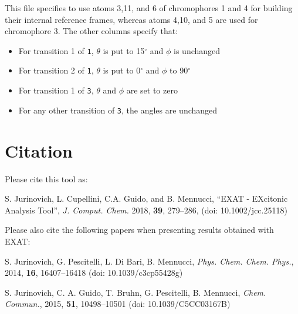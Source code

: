 \documentclass[a4paper,11pt]{article}
\begin{document}
This file specifies to use atoms 3,11, and 6 of chromophores 1 and 4 for building their internal reference frames, whereas atoms 4,10, and 5 are used for chromophore 3. 
The other columns specify that:
\begin{itemize}
\item For transition 1 of \texttt{1}, $\theta$ is put to 15$^{\circ}$ and $\phi$ is unchanged
\item For transition 2 of \texttt{1}, $\theta$ is put to 0$^{\circ}$ and $\phi$ to 90$^{\circ}$ 
\item For transition 1 of \texttt{3}, $\theta$ and $\phi$ are set to zero
\item For any other transition of \texttt{3}, the angles are unchanged 
\end{itemize}


\section{Citation}

Please cite this tool as: 

S. Jurinovich, L. Cupellini, C.A. Guido, and B. Mennucci,  ``EXAT - EXcitonic Analysis Tool'', \emph{J. Comput. Chem.} 2018, \textbf{39}, 279--286,   (doi: 10.1002/jcc.25118)


Please also cite the following papers when presenting results obtained with EXAT:


S. Jurinovich, G. Pescitelli, L. Di Bari, B. Mennucci, \emph{Phys. Chem. Chem. Phys.}, 2014, \textbf{16}, 16407--16418 (doi: 10.1039/c3cp55428g)

S. Jurinovich, C. A. Guido, T. Bruhn, G. Pescitelli, B. Mennucci,  \emph{Chem. Commun.}, 2015, \textbf{51}, 10498--10501 (doi: 10.1039/C5CC03167B)
\end{document}

